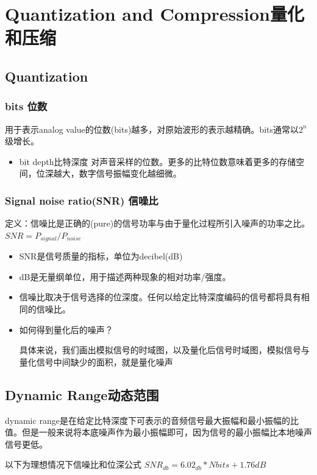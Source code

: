 \documentclass[UTF8]{ctexart}
\begin{document}
\section{Quantization and Compression量化和压缩}

\subsection{Quantization}
\subsubsection{bits 位数}
用于表示analog value的位数(bits)越多，对原始波形的表示越精确。bits通常以$2^n$级增长。

\begin{itemize}
    \item bit depth比特深度
    对声音采样的位数。更多的比特位数意味着更多的存储空间，位深越大，数字信号振幅变化越细微。
\end{itemize}
\subsubsection{Signal noise ratio(SNR) 信噪比}

定义：信噪比是正确的(pure)的信号功率与由于量化过程所引入噪声的功率之比。
$SNR=P_{signal}/P_{noise}$



\begin{itemize}
    \item SNR是信号质量的指标，单位为decibel(dB)
    \item dB是无量纲单位，用于描述两种现象的相对功率/强度。
    \item 信噪比取决于信号选择的位深度。任何以给定比特深度编码的信号都将具有相同的信噪比。
    \item 如何得到量化后的噪声？
    
    具体来说，我们画出模拟信号的时域图，以及量化后信号时域图，模拟信号与量化信号中间缺少的面积，就是量化噪声
\end{itemize}

\subsection{Dynamic Range动态范围}
dynamic range是在给定比特深度下可表示的音频信号最大振幅和最小振幅的比值。但是一般来说将本底噪声作为最小振幅即可，因为信号的最小振幅比本地噪声信号更低。

以下为理想情况下信噪比和位深公式
$SNR_{db}=6.02_{db}*Nbits+1.76dB$
\end{document}
